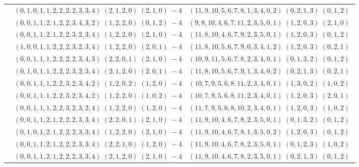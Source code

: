 \documentclass[11pt]{article}
\begin{document}
\begin{longtable}[l]{|c|c|c|}
 \cline{2-3} 
 & $(0 ,1 ,0 ,1 ,1 ,2 ,2 ,2 ,2 ,3 ,3 ,4) \;(2 ,1 ,2 ,0) \;(2 ,1 ,0) \;-4$ & $(11 ,9 ,10 ,5 ,6 ,7 ,8 ,1 ,3 ,4 ,0 ,2) \;(0 ,2 ,1 ,3) \;(0 ,1 ,2) \;$\\ 
 \cline{2-3} 
 & $(0 ,0 ,1 ,1 ,2 ,1 ,2 ,2 ,3 ,4 ,3 ,2) \;(1 ,2 ,2 ,0) \;(0 ,1 ,2) \;-4$ & $(9 ,8 ,10 ,4 ,6 ,7 ,11 ,2 ,3 ,5 ,0 ,1) \;(1 ,2 ,0 ,3) \;(2 ,1 ,0) \;$\\ 
 \cline{2-3} 
 & $(0 ,0 ,1 ,1 ,2 ,1 ,2 ,2 ,3 ,2 ,3 ,4) \;(1 ,2 ,2 ,0) \;(2 ,1 ,0) \;-4$ & $(11 ,8 ,10 ,4 ,6 ,7 ,9 ,2 ,3 ,5 ,0 ,1) \;(1 ,2 ,0 ,3) \;(0 ,1 ,2) \;$\\ 
 \cline{2-3} 
 & $(1 ,0 ,0 ,1 ,1 ,2 ,2 ,2 ,3 ,2 ,3 ,4) \;(1 ,2 ,2 ,0) \;(2 ,0 ,1) \;-4$ & $(11 ,8 ,10 ,5 ,6 ,7 ,9 ,0 ,3 ,4 ,1 ,2) \;(1 ,2 ,0 ,3) \;(0 ,2 ,1) \;$\\ 
 \cline{2-3} 
 & $(0 ,0 ,1 ,1 ,1 ,2 ,2 ,2 ,2 ,3 ,4 ,3) \;(2 ,2 ,0 ,1) \;(2 ,1 ,0) \;-4$ & $(10 ,9 ,11 ,5 ,6 ,7 ,8 ,2 ,3 ,4 ,0 ,1) \;(0 ,1 ,3 ,2) \;(0 ,1 ,2) \;$\\ 
 \cline{2-3} 
 & $(0 ,1 ,0 ,1 ,1 ,2 ,2 ,2 ,3 ,2 ,3 ,4) \;(2 ,1 ,2 ,0) \;(2 ,0 ,1) \;-4$ & $(11 ,8 ,10 ,5 ,6 ,7 ,9 ,1 ,3 ,4 ,0 ,2) \;(0 ,2 ,1 ,3) \;(0 ,2 ,1) \;$\\ 
 \cline{2-3} 
 & $(0 ,0 ,1 ,1 ,1 ,2 ,2 ,3 ,2 ,3 ,4 ,2) \;(1 ,2 ,0 ,2) \;(1 ,2 ,0) \;-4$ & $(10 ,7 ,9 ,5 ,6 ,8 ,11 ,2 ,3 ,4 ,0 ,1) \;(1 ,3 ,0 ,2) \;(1 ,0 ,2) \;$\\ 
 \cline{2-3} 
 & $(0 ,0 ,1 ,1 ,1 ,2 ,2 ,3 ,2 ,3 ,4 ,2) \;(1 ,2 ,2 ,0) \;(1 ,0 ,2) \;-4$ & $(10 ,7 ,9 ,5 ,6 ,8 ,11 ,2 ,3 ,4 ,0 ,1) \;(1 ,2 ,0 ,3) \;(2 ,0 ,1) \;$\\ 
 \cline{2-3} 
 & $(0 ,0 ,1 ,1 ,1 ,2 ,2 ,3 ,2 ,3 ,2 ,4) \;(1 ,2 ,2 ,0) \;(1 ,2 ,0) \;-4$ & $(11 ,7 ,9 ,5 ,6 ,8 ,10 ,2 ,3 ,4 ,0 ,1) \;(1 ,2 ,0 ,3) \;(1 ,0 ,2) \;$\\ 
 \cline{2-3} 
 & $(0 ,0 ,1 ,1 ,2 ,1 ,2 ,2 ,2 ,3 ,3 ,4) \;(2 ,2 ,0 ,1) \;(2 ,1 ,0) \;-4$ & $(11 ,9 ,10 ,4 ,6 ,7 ,8 ,2 ,3 ,5 ,0 ,1) \;(0 ,1 ,3 ,2) \;(0 ,1 ,2) \;$\\ 
 \cline{2-3} 
 & $(0 ,1 ,0 ,1 ,2 ,1 ,2 ,2 ,2 ,3 ,3 ,4) \;(1 ,2 ,2 ,0) \;(2 ,1 ,0) \;-4$ & $(11 ,9 ,10 ,4 ,6 ,7 ,8 ,1 ,3 ,5 ,0 ,2) \;(1 ,2 ,0 ,3) \;(0 ,1 ,2) \;$\\ 
 \cline{2-3} 
 & $(0 ,0 ,1 ,1 ,2 ,1 ,2 ,2 ,2 ,3 ,3 ,4) \;(2 ,2 ,1 ,0) \;(1 ,2 ,0) \;-4$ & $(11 ,9 ,10 ,4 ,6 ,7 ,8 ,2 ,3 ,5 ,0 ,1) \;(0 ,1 ,2 ,3) \;(1 ,0 ,2) \;$\\ 
 \cline{2-3} 
 & $(0 ,0 ,1 ,1 ,2 ,1 ,2 ,2 ,2 ,3 ,3 ,4) \;(2 ,1 ,2 ,0) \;(2 ,1 ,0) \;-4$ & $(11 ,9 ,10 ,4 ,6 ,7 ,8 ,2 ,3 ,5 ,0 ,1) \;(0 ,2 ,1 ,3) \;(0 ,1 ,2) \;$\\ 

\end{longtable}
\end{document}

